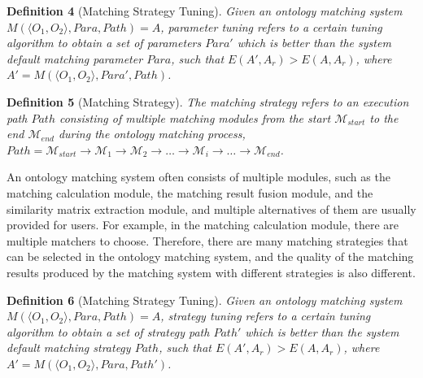 \documentclass[twoside]{article}
\begin{document}
\begin{multicols}{2}
{\bf Definition 4} (Matching Strategy Tuning). {\it Given an ontology matching system $ M (\langle O_1, O_2\rangle , Para, Path) = A $, parameter tuning refers to a certain tuning algorithm to obtain a set of parameters $Para'$ which is better than the system default matching parameter $Para$, such that $E (A', A_r)> E (A, A_r)$, where $A'=M (\langle O_1, O_2\rangle , Para', Path)$.}



{\bf Definition 5} (Matching Strategy). {\it The matching strategy refers to an execution path $Path$ consisting of multiple matching modules from the start $\mathcal{M}_{start}$ to the end $\mathcal{M}_{end}$ during the ontology matching process, $Path = \mathcal{M}_{start}\to \mathcal{M}_1\to \mathcal{M}_2 \to \dots \to \mathcal{M}_i\to \dots \to \mathcal{M}_{end}$.}

An ontology matching system often consists of multiple modules, such as the matching calculation module, the matching result fusion module, and the similarity matrix extraction module, and multiple alternatives of them are usually provided for users. For example, in the matching calculation module, there are multiple matchers to choose.
Therefore, there are many matching strategies that can be selected in the ontology matching system, and the quality of the matching results produced by the matching system with different strategies is also different.



{\bf Definition 6} (Matching Strategy Tuning). {\it Given an ontology matching system $ M (\langle O_1, O_2\rangle , Para, Path) = A $, strategy tuning refers to a certain tuning algorithm to obtain a set of strategy path $Path'$ which is better than the system default matching strategy $Path$, such that $E (A', A_r)> E (A, A_r)$, where $A'=M (\langle O_1, O_2\rangle , Para, Path')$.}


\end{multicols}
\end{document}
